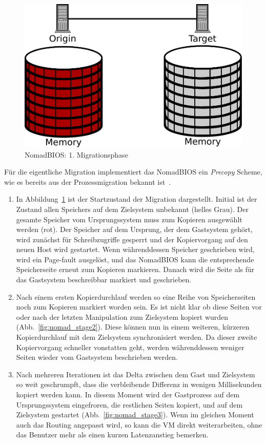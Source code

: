 \begin{figure}[b]
  \centering
  \includegraphics[width=0.7\linewidth]{images/nomad_stage1}
  \caption{NomadBIOS: 1. Migrationsphase}
  \label{fig:nomad_stage1}
\end{figure}
Für die eigentliche Migration implementiert das NomadBIOS ein
\emph{Precopy} Scheme, wie es bereits aus der Prozessmigration bekannt
ist~\cite{hansen2002nomadic}.
\begin{enumerate}
\item In Abbildung~\ref{fig:nomad_stage1} ist der Startzustand der
  Migration dargestellt. Initial ist der Zustand allen Speichers auf
  dem Zielsystem unbekannt (helles Grau). Der gesamte Speicher vom
  Ursprungssystem muss zum Kopieren ausgewählt werden (rot). Der
  Speicher auf dem Ursprung, der dem Gastsystem gehört, wird zunächst
  für Schreibzugriffe gesperrt und der Kopiervorgang auf den neuen
  Host wird gestartet. Wenn währenddessen Speicher geschrieben wird,
  wird ein Page-fault ausgelöst, und das NomadBIOS kann die
  entsprechende Speicherseite erneut zum Kopieren markieren. Danach
  wird die Seite als für das Gastsystem beschreibbar markiert und
  geschrieben.
\item Nach einem ersten Kopierdurchlauf werden so eine Reihe von
  Speicherseiten noch zum Kopieren markiert worden sein. Es ist nicht
  klar ob diese Seiten vor oder nach der letzten Manipulation zum
  Zielsystem kopiert wurden (Abb.~\ref{fig:nomad_stage2}). Diese
  können nun in einem weiteren, kürzeren Kopierdurchlauf mit dem
  Zielsystem synchronisiert werden. Da dieser zweite Kopiervorgang
  schneller vonstatten geht, werden währenddessen weniger Seiten
  wieder vom Gastsystem beschrieben werden.
\item Nach mehreren Iterationen ist das Delta zwischen dem Gast und
  Zielsystem so weit geschrumpft, dass die verbleibende Differenz in
  wenigen Millisekunden kopiert werden kann. In diesem Moment wird der
  Gastprozess auf dem Ursprungssystem eingefroren, die restlichen
  Seiten kopiert, und auf dem Zielsystem gestartet
  (Abb.~\ref{fig:nomad_stage3}). Wenn im gleichen Moment auch das
  Routing angepasst wird, so kann die VM direkt weiterarbeiten, ohne
  das Benutzer mehr als einen kurzen Latenzanstieg bemerken.
\end{enumerate}
